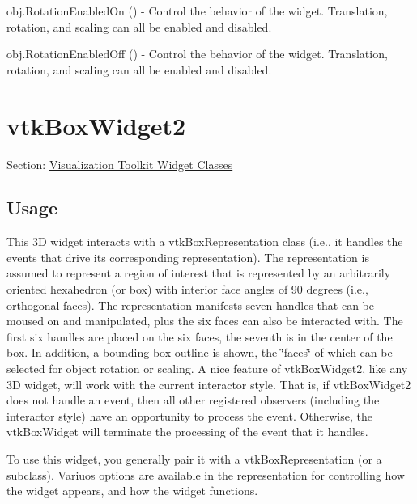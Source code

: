 \begin{DoxyItemize}
\item {\ttfamily obj.\-Rotation\-Enabled\-On ()} -\/ Control the behavior of the widget. Translation, rotation, and scaling can all be enabled and disabled.  
\item {\ttfamily obj.\-Rotation\-Enabled\-Off ()} -\/ Control the behavior of the widget. Translation, rotation, and scaling can all be enabled and disabled.  
\end{DoxyItemize}\hypertarget{vtkwidgets_vtkboxwidget2}{}\section{vtk\-Box\-Widget2}\label{vtkwidgets_vtkboxwidget2}
Section\-: \hyperlink{sec_vtkwidgets}{Visualization Toolkit Widget Classes} \hypertarget{vtkwidgets_vtkxyplotwidget_Usage}{}\subsection{Usage}\label{vtkwidgets_vtkxyplotwidget_Usage}
This 3\-D widget interacts with a vtk\-Box\-Representation class (i.\-e., it handles the events that drive its corresponding representation). The representation is assumed to represent a region of interest that is represented by an arbitrarily oriented hexahedron (or box) with interior face angles of 90 degrees (i.\-e., orthogonal faces). The representation manifests seven handles that can be moused on and manipulated, plus the six faces can also be interacted with. The first six handles are placed on the six faces, the seventh is in the center of the box. In addition, a bounding box outline is shown, the \char`\"{}faces\char`\"{} of which can be selected for object rotation or scaling. A nice feature of vtk\-Box\-Widget2, like any 3\-D widget, will work with the current interactor style. That is, if vtk\-Box\-Widget2 does not handle an event, then all other registered observers (including the interactor style) have an opportunity to process the event. Otherwise, the vtk\-Box\-Widget will terminate the processing of the event that it handles.

To use this widget, you generally pair it with a vtk\-Box\-Representation (or a subclass). Variuos options are available in the representation for controlling how the widget appears, and how the widget functions.


